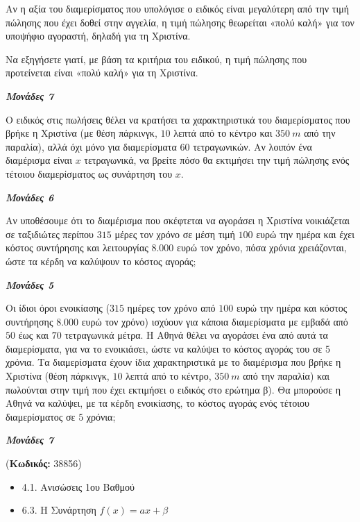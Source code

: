 \documentclass[11pt,a4paper,twoside]{book}
\newcounter{askhsh}[chapter]
\renewcommand{\theaskhsh}{
	\bf{\titlefont{\Large{\thechapter}}.\arabic{askhsh}}
}
\newcommand{\Askhsh}[2]{\refstepcounter{askhsh}{\titlefont{Άσκηση\theaskhsh} - \textcolor{maincolor}{ΘΕΜΑ #2}} ({\small{\textbf{Κωδικός:} #1}})\\}{}
\newenvironment{ylh}{
\begin{tcolorbox}[
breakable,
enhanced standard,
titlerule=0pt,
toprule=0pt, 
rightrule=0pt, 
bottomrule=0pt,
title={\titlefont Ύλη άσκησης},
colback=white,
opacityback=0,
left=2mm,
top=1mm,
bottom=0mm,
boxrule=0pt,
colframe=white,
borderline west={1.5mm}{0pt}{secondarycolor},
leftrule=2mm,
sharp corners,
coltitle=black
]
\begin{itemize}[leftmargin=3mm, itemsep=0mm, label=\textcolor{secondarycolor}{{\small\faBook}}]
}{
\end{itemize}
\end{tcolorbox}
}
\newcommand{\monades}[1]{
\hspace*{\fill}
\textbf{\textit{\textcolor{maincolor}{Μονάδες #1}}}}
\begin{document}
Αν η αξία του διαμερίσματος που υπολόγισε ο ειδικός είναι μεγαλύτερη από την τιμή πώλησης που έχει δοθεί στην αγγελία, η τιμή πώλησης θεωρείται «πολύ καλή» για τον υποψήφιο αγοραστή, δηλαδή για τη Χριστίνα.

\begin{alist}
\item Να εξηγήσετε γιατί, με βάση τα κριτήρια του ειδικού, η τιμή πώλησης που προτείνεται είναι «πολύ καλή» για τη Χριστίνα.
\monades{7}
\item Ο ειδικός στις πωλήσεις θέλει να κρατήσει τα χαρακτηριστικά του διαμερίσματος που βρήκε η Χριστίνα (με θέση πάρκινγκ, $10$ λεπτά από το κέντρο και $350\ m$ από την παραλία), αλλά όχι μόνο για διαμερίσματα $60$ τετραγωνικών. Αν λοιπόν ένα διαμέρισμα είναι $x$ τετραγωνικά, να βρείτε πόσο θα εκτιμήσει την τιμή πώλησης ενός τέτοιου διαμερίσματος ως συνάρτηση του $x$.
\monades{6}
\item

\begin{rlist}
\item Αν υποθέσουμε ότι το διαμέρισμα που σκέφτεται να αγοράσει η Χριστίνα νοικιάζεται σε ταξιδιώτες περίπου $315$ μέρες τον χρόνο σε μέση τιμή $100$ ευρώ την ημέρα και έχει κόστος συντήρησης και λειτουργίας $8.000$ ευρώ τον χρόνο, πόσα χρόνια χρειάζονται, ώστε τα κέρδη να καλύψουν το κόστος αγοράς;
\monades{5}
\item Οι ίδιοι όροι ενοικίασης ($315$ ημέρες τον χρόνο από $100$ ευρώ την ημέρα και κόστος συντήρησης $8.000$ ευρώ τον χρόνο) ισχύουν για κάποια διαμερίσματα με εμβαδά από $50$ έως και $70$ τετραγωνικά μέτρα. Η Αθηνά θέλει να αγοράσει ένα από αυτά τα διαμερίσματα, για να το ενοικιάσει, ώστε να καλύψει το κόστος αγοράς του σε 5 χρόνια. Τα διαμερίσματα έχουν ίδια χαρακτηριστικά με το διαμέρισμα που βρήκε η Χριστίνα (θέση πάρκινγκ, $10$ λεπτά από το κέντρο, $350\ m$ από την παραλία) και πωλούνται στην τιμή που έχει εκτιμήσει ο ειδικός στο ερώτημα β). Θα μπορούσε η Αθηνά να καλύψει, με τα κέρδη ενοικίασης, το κόστος αγοράς ενός τέτοιου διαμερίσματος σε $5$ χρόνια;
\monades{7}
\end{rlist}
\end{alist}

\vspace{4mm}
\Askhsh{38856}{4}
\begin{ylh}
    \item 4.1. Ανισώσεις 1ου Βαθμού
    \item 6.3. Η Συνάρτηση $f(x)=ax+\beta$
\end{ylh}
\end{document}
